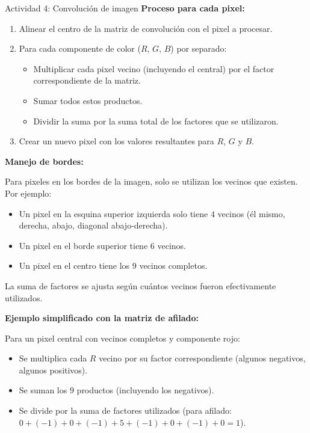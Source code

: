 \documentclass{ip-lab}
\begin{document}
\begin{sectionbox}{Actividad 4: Convolución de imagen}
  \textbf{Proceso para cada pixel:}
  \begin{enumerate}
      \item Alinear el centro de la matriz de convolución con el pixel a procesar.
      \item Para cada componente de color (\(R\), \(G\), \(B\)) por separado:
      \begin{itemize}
          \item Multiplicar cada pixel vecino (incluyendo el central) por el factor correspondiente de la matriz.
          \item Sumar todos estos productos.
          \item Dividir la suma por la suma total de los factores que se utilizaron.
      \end{itemize}
      \item Crear un nuevo pixel con los valores resultantes para \(R\), \(G\) y \(B\).
  \end{enumerate}
  
  \textbf{Manejo de bordes:}
  
  Para pixeles en los bordes de la imagen, solo se utilizan los vecinos que existen. Por ejemplo:
  \begin{itemize}
      \item Un pixel en la esquina superior izquierda solo tiene \(4\) vecinos (él mismo, derecha, abajo, diagonal abajo-derecha).
      \item Un pixel en el borde superior tiene \(6\) vecinos.
      \item Un pixel en el centro tiene los \(9\) vecinos completos.
  \end{itemize}
  
  La suma de factores se ajusta según cuántos vecinos fueron efectivamente utilizados.
  
  \textbf{Ejemplo simplificado con la matriz de afilado:}
  
  Para un pixel central con vecinos completos y componente rojo:
  \begin{itemize}
      \item Se multiplica cada \(R\) vecino por su factor correspondiente (algunos negativos, algunos positivos).
      \item Se suman los \(9\) productos (incluyendo los negativos).
      \item Se divide por la suma de factores utilizados (para afilado: \(0+(-1)+0+(-1)+5+(-1)+0+(-1)+0 = 1\)).
  \end{itemize}
  

\end{sectionbox}
\end{document}
